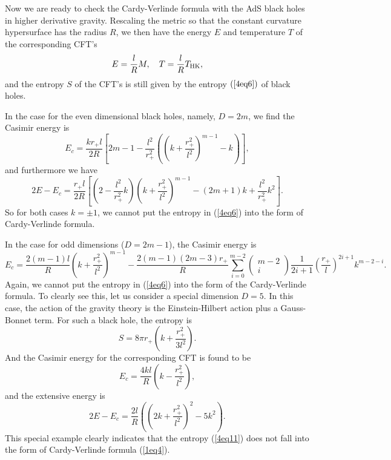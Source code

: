 \documentclass[a4paper,12pt]{article}
\begin{document}
Now we are ready to check the Cardy-Verlinde formula with the AdS black holes
in higher derivative gravity. Rescaling the metric so that the constant 
curvature hypersurface has the radius $R$, we then have the energy $E$ and
temperature $T$ of the corresponding CFT's 
\begin{equation}
\label{4eq7}
 E = \frac{l}{R}M, \ \ \  T=\frac{l}{R}T_{\rm HK},
\end{equation}
and the entropy $S$ of the CFT's is still given by the entropy $(\ref{4eq6})$
of black holes. 
 
In the case for the even dimensional black holes, namely, $D=2m$, we find 
the Casimir energy is
\begin{equation}
\label{4eq8}
E_c= \frac{kr_+l}{2R}\left [ 2m-1 -\frac{l^2}{r_+^2}\left(\left(k+\frac{r_+^2}
      {l^2}\right)^{m-1}-k\right)\right],
\end{equation}
and furthermore we have
\begin{equation}
\label{4eq9}
2E-E_c=\frac{r_+l}{2R}\left[ \left(2-\frac{l^2}{r_+^2}k\right) 
     \left(k+\frac{r_+^2}{l^2}\right)^{m-1}- (2m+1)k 
   +\frac{l^2}{r_+^2}k^2\right].
\end{equation}
So for both cases $k=\pm 1$, we cannot put the entropy in (\ref{4eq6})
into the form of Cardy-Verlinde formula. 


In the case for odd dimensions ($D=2m-1$), the Casimir energy is
\begin{equation}
\label{4eq10}
E_c= \frac{2(m-1)l}{R}\left(k+\frac{r_+^2}{l^2}\right)^{m-1}
    -\frac{2(m-1)(2m-3)r_+}{R}
 \sum_{i=0}^{m-2}\left(
\begin{array}{c}
m-2 \\ i 
\end{array} \right) 
\frac{1}{2i +1}\left(\frac{r_+}{l}\right)^{2i+1}k^{m-2-i}.
\end{equation}
Again, we cannot put the entropy in (\ref{4eq6}) into the form 
of the Cardy-Verlinde formula. To clearly see this, let us consider a special
dimension $D=5$. In this case, the action of the gravity theory is the 
Einstein-Hilbert action plus a Gauss-Bonnet term. For such a black hole,
the entropy is
\begin{equation}
\label{4eq11}
S=8\pi r_+ \left(k +\frac{r_+^2}{3l^2}\right).
\end{equation}
And the Casimir energy for the corresponding CFT is found to be
\begin{equation}
\label{4eq12}
E_c= \frac{4kl}{R}\left (k-\frac{r_+^2}{l^2} \right),   
\end{equation}
and the extensive energy is
\begin{equation}
2E-E_c = \frac{2l}{R}\left(\left(2k +\frac{r_+^2}{l^2}\right)^2 -5k^2\right).
\end{equation}
This special example clearly indicates that the entropy (\ref{4eq11}) does
not fall into the form of Cardy-Verlinde formula (\ref{1eq4}). 
\end{document}
